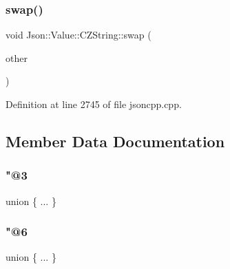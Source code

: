 \hypertarget{class_json_1_1_value_1_1_c_z_string_ad59f3542d2eea749a6a63409d1a02207}{}\label{class_json_1_1_value_1_1_c_z_string_ad59f3542d2eea749a6a63409d1a02207} 
\subsubsection{\texorpdfstring{swap()}{swap()}\hspace{0.1cm}{\footnotesize\ttfamily [2/2]}}
{\footnotesize\ttfamily void Json\+::\+Value\+::\+C\+Z\+String\+::swap (\begin{DoxyParamCaption}\item[{\hyperlink{class_json_1_1_value_1_1_c_z_string}{C\+Z\+String} \&}]{other }\end{DoxyParamCaption})\hspace{0.3cm}{\ttfamily [private]}}



Definition at line 2745 of file jsoncpp.\+cpp.



\subsection{Member Data Documentation}
\hypertarget{class_json_1_1_value_1_1_c_z_string_a418e8592420f5180dacb5fcaad398eb7}{}\label{class_json_1_1_value_1_1_c_z_string_a418e8592420f5180dacb5fcaad398eb7} 
\subsubsection{\texorpdfstring{"@3}{@3}}
{\footnotesize\ttfamily union \{ ... \} \hspace{0.3cm}{\ttfamily [private]}}

\hypertarget{class_json_1_1_value_1_1_c_z_string_adb04af687ae244b88f429db1f021dada}{}\label{class_json_1_1_value_1_1_c_z_string_adb04af687ae244b88f429db1f021dada} 
\subsubsection{\texorpdfstring{"@6}{@6}}
{\footnotesize\ttfamily union \{ ... \} \hspace{0.3cm}{\ttfamily [private]}}

\hypertarget{class_json_1_1_value_1_1_c_z_string_a9195eb3d83f19d625b02a5d52d9028b7}{}\label{class_json_1_1_value_1_1_c_z_string_a9195eb3d83f19d625b02a5d52d9028b7} 
